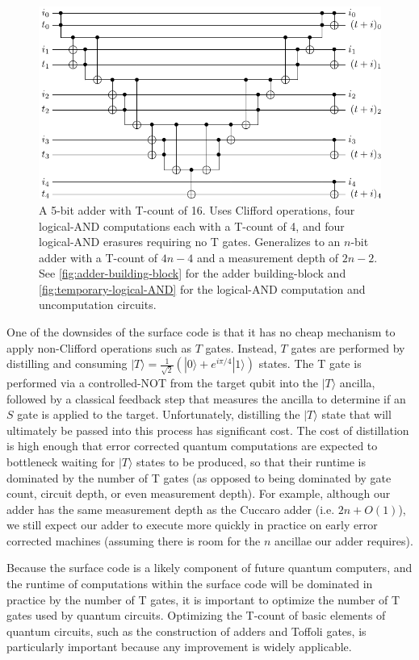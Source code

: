 \documentclass[twocolumn]{quantumarticle-customized}
\begin{document}
\begin{figure}
  \includegraphics[width=\linewidth]{adder.pdf}
  \caption{
	A 5-bit adder with T-count of 16.
	Uses Clifford operations, four logical-AND computations each with a T-count of 4, and four logical-AND erasures requiring no T gates.
	Generalizes to an $n$-bit adder with a T-count of $4n - 4$ and a measurement depth of $2n - 2$.
	See \autoref{fig:adder-building-block} for the adder building-block and \autoref{fig:temporary-logical-AND} for the logical-AND computation and uncomputation circuits.
  }
  \label{fig:adder}
\end{figure}

One of the downsides of the surface code is that it has no cheap mechanism to apply non-Clifford operations such as $T$ gates.
Instead, $T$ gates are performed by distilling and consuming $|T\rangle = \frac{1}{\sqrt{2}} (|0\rangle + e^{i \pi/4} |1\rangle)$ states.
The T gate is performed via a controlled-NOT from the target qubit into the $|T\rangle$ ancilla, followed by a classical feedback step that measures the ancilla to determine if an $S$ gate is applied to the target.
Unfortunately, distilling the $|T\rangle$ state that will ultimately be passed into this process has significant cost.
The cost of distillation is high enough that error corrected quantum computations are expected to bottleneck waiting for $|T\rangle$ states to be produced, so that their runtime is dominated by the number of T gates (as opposed to being dominated by gate count, circuit depth, or even measurement depth).
For example, although our adder has the same measurement depth as the Cuccaro adder (i.e. $2n + O(1)$), we still expect our adder to execute more quickly in practice on early error corrected machines (assuming there is room for the $n$ ancillae our adder requires).

Because the surface code is a likely component of future quantum computers, and the runtime of computations within the surface code will be dominated in practice by the number of T gates, it is important to optimize the number of T gates used by quantum circuits.
Optimizing the T-count of basic elements of quantum circuits, such as the construction of adders and Toffoli gates, is particularly important because any improvement is widely applicable.
\end{document}
